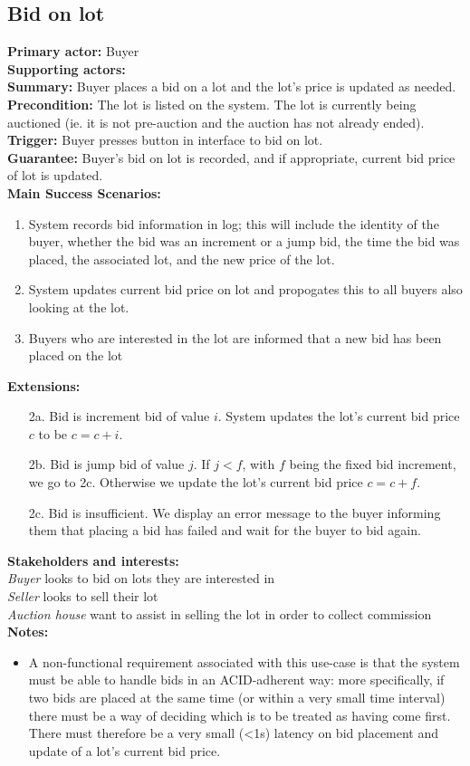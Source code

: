 \documentclass[titlepage, 12pt]{extarticle}
\begin{document}
\subsection{Bid on lot}
{\bf Primary actor: } Buyer
\\{\bf Supporting actors: } 
\\{\bf Summary: } Buyer places a bid on a lot and the lot's price is updated as needed. 
\\{\bf Precondition: } The lot is listed on the system. The lot is currently being auctioned (ie. it is not pre-auction and the auction has not already ended).  
\\{\bf Trigger: } Buyer presses button in interface to bid on lot.
\\{\bf Guarantee: } Buyer's bid on lot is recorded, and if appropriate, current bid price of lot is updated. 
\\{\bf Main Success Scenarios: } 
\begin{enumerate}
\item System records bid information in log; this will include the identity of the buyer, whether the bid was an increment or a jump bid, the time the bid was placed, the associated lot, and the new price of the lot. 
\item System updates current bid price on lot and propogates this to all buyers also looking at the lot. 
\item Buyers who are interested in the lot are informed that a new bid has been placed on the lot
\end{enumerate}
  {\bf Extensions: }
\begin{itemize}
\item [2a.] Bid is increment bid of value $i$. System updates the lot's current bid price $c$ to be $c = c + i$.
\item [2b.] Bid is jump bid of value $j$. If $j < f$, with $f$ being the fixed bid increment, we go to 2c. Otherwise we update the lot's current bid price $c = c + f$.
\item [2c.] Bid is insufficient. We display an error message to the buyer informing them that placing a bid has failed and wait for the buyer to bid again. 
\end{itemize}
{\bf Stakeholders and interests: }
\\{\em Buyer} looks to bid on lots they are interested in
\\{\em Seller} looks to sell their lot
\\{\em Auction house} want to assist in selling the lot in order to collect commission
\\{\bf Notes:}
\begin{itemize}
  \item A non-functional requirement associated with this use-case is that the system must be able to handle bids in an ACID-adherent way: more specifically, if two bids are placed at the same time (or within a very small time interval) there must be a way of deciding which is to be treated as having come first. There must therefore be a very small (<1s) latency on bid placement and update of a lot's current bid price. 
\end{itemize}
\end{document}

